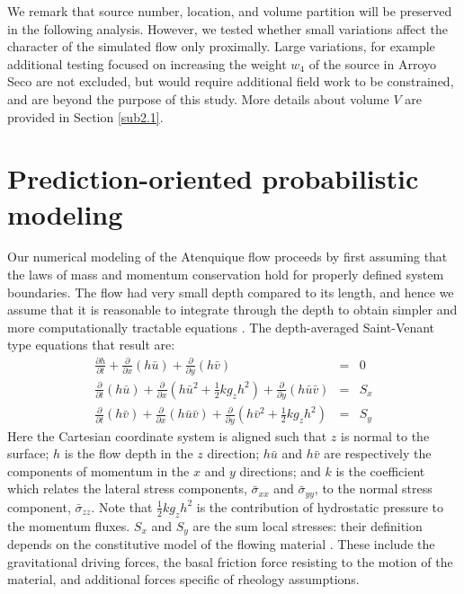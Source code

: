 \documentclass[nhess, manuscript]{copernicus}
\begin{document}
We remark that source number, location, and volume partition will be preserved in the following analysis. However, we tested whether small variations affect the character of the simulated flow only proximally. Large variations, for example additional testing focused on increasing the weight $w_4$ of the source in Arroyo Seco are not excluded, but would require additional field work to be constrained, and are beyond the purpose of this study. More details about volume $V$ are provided in Section \ref{sub2.1}.

\section{Prediction-oriented probabilistic modeling}\label{s2}
Our numerical modeling of the Atenquique flow proceeds by first assuming that the laws of mass and momentum conservation hold for properly defined system boundaries. The flow had very small depth compared to its length, and hence we assume that it is reasonable to integrate through the depth to obtain simpler and more computationally tractable equations \citep{SavageHutter1989}. The depth-averaged Saint-Venant type equations that result are:
\begin{eqnarray}
\label{eq:D_A}
\frac{\partial h}{\partial t} +
\frac{\partial}{\partial x}(h \bar{u}) +
\frac{\partial}{\partial y}(h\bar{v}) &=& 0 \nonumber \\
\frac{\partial}{\partial t} (h\bar{u}) +
\frac{\partial}{\partial x}\left(h\bar{u}^2 + \frac{1}{2}k g_{z}h^2\right) + \frac{\partial}{\partial y}(h\bar{u}\bar{v}) &=& S_{x}\\
\frac{\partial}{\partial t} (h\bar{v}) +
\frac{\partial}{\partial x}(h\bar{u}\bar{v}) +
\frac{\partial}{\partial y}\left(h\bar{v}^2 + \frac{1}{2}k g_{z}h^2\right) &=& S_{y} \nonumber
\end{eqnarray}
Here the Cartesian coordinate system is aligned such that $z$ is normal to the surface; $h$ is the flow depth in the $z$ direction; $h\bar{u}$ and $h\bar{v}$ are respectively the components of momentum in the $x$ and $y$ directions; and $k$ is the coefficient which relates the lateral stress components, $\bar{\sigma}_{xx}$ and $\bar{\sigma}_{yy}$, to the normal stress component, $\bar{\sigma}_{zz}$. Note that $\frac{1}{2} k g_z h^2$ is the contribution of hydrostatic pressure to the momentum fluxes. $S_x$ and $S_y$ are the sum local stresses: their definition depends on the constitutive model of the flowing material \citep{Kelfoun2011}. These include the gravitational driving forces, the basal friction force resisting to the motion of the material, and additional forces specific of rheology assumptions.
\end{document}
